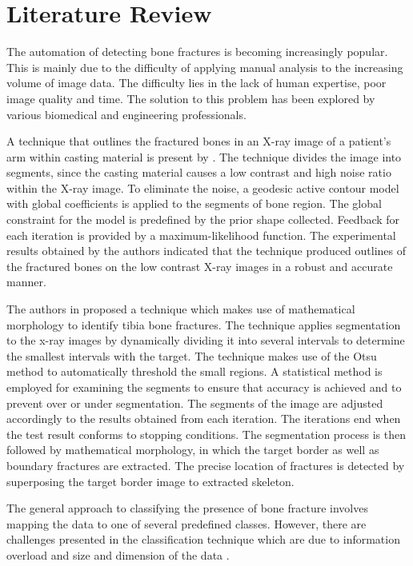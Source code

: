 \documentclass[11pt,twocolumn]{witseiepaper}
\begin{document}
	\section{Literature Review}
	The automation of detecting bone fractures is becoming increasingly popular. This is mainly due to the difficulty of applying manual analysis to the increasing volume of image data. The difficulty lies in the lack of human expertise, poor image quality and time. The solution to this problem has been explored by various biomedical and engineering professionals. 
	
	A technique that outlines the fractured bones in an X-ray image of a patient's arm within casting material is present by \cite{Jia_Jiang2006}. The technique divides the image into segments, since the casting material causes a low contrast and high noise ratio within the X-ray image. To eliminate the noise, a geodesic active contour model with global coefficients is applied to the segments of bone region. The global constraint for the model is predefined by the prior shape collected. Feedback for each iteration is provided by a maximum-likelihood function. The experimental results obtained by the authors indicated that the technique produced outlines of the fractured bones on the low contrast X-ray images in a robust and accurate manner.
	
	The authors in \cite{Liang_Pan_Huang_Fan_2010} proposed a technique which makes use of mathematical morphology to identify tibia bone fractures. The technique applies segmentation to the x-ray images by dynamically dividing it into several intervals to determine the smallest intervals with the target. The technique makes use of the Otsu method to automatically threshold the small regions. A statistical method is employed for examining the segments to ensure that accuracy is achieved and to prevent over or under segmentation. The segments of the image are adjusted accordingly to the results obtained from each iteration. The iterations end when the test result conforms to stopping conditions. The segmentation process is then followed by mathematical morphology, in which the target border as well as boundary fractures are extracted. The precise location of fractures is detected by superposing the target border image to extracted skeleton.
	
	The general approach to classifying the presence of bone fracture involves mapping the data to one of several predefined classes. However, there are challenges presented 
	in the classification technique which are due to information overload and size and dimension of the data \cite{Mahendran2011}. 
	
\end{document}
